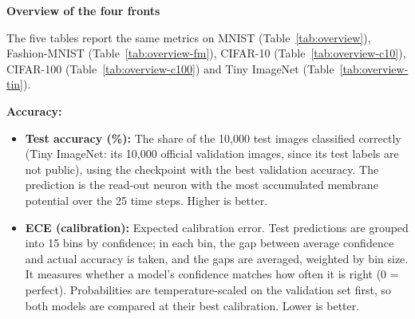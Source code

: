 \documentclass{article}
\begin{document}
{
\noindent\textbf{Overview of the four fronts}\par\smallskip
\noindent The five tables report the same metrics on MNIST (Table~\ref{tab:overview}), Fashion-MNIST (Table~\ref{tab:overview-fm}), CIFAR-10 (Table~\ref{tab:overview-c10}), CIFAR-100 (Table~\ref{tab:overview-c100}) and Tiny ImageNet (Table~\ref{tab:overview-tin}).\par\smallskip
\noindent\textbf{Accuracy:}
\begin{itemize}
  \item \textbf{Test accuracy (\%):} The share of the 10,000 test images classified correctly (Tiny ImageNet: its 10,000 official validation images, since its test labels are not public), using the checkpoint with the best validation accuracy. The prediction is the read-out neuron with the most accumulated membrane potential over the 25 time steps. Higher is better.
  \item \textbf{ECE (calibration):} Expected calibration error. Test predictions are grouped into 15 bins by confidence; in each bin, the gap between average confidence and actual accuracy is taken, and the gaps are averaged, weighted by bin size. It measures whether a model's confidence matches how often it is right (0 = perfect). Probabilities are temperature-scaled on the validation set first, so both models are compared at their best calibration. Lower is better.
\end{itemize}

}
\end{document}
